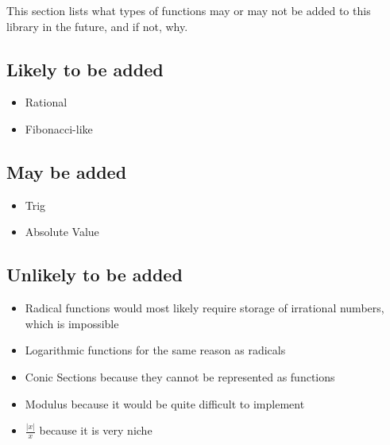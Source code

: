 \documentclass[12pt, letterpaper]{article}
\begin{document}
This section lists what types of functions may or may not be added
to this library in the future, and if not, why.

\subsection{Likely to be added}
\begin{itemize}
    \item Rational
    \item Fibonacci-like
\end{itemize}


\subsection{May be added}
\begin{itemize}
    \item Trig
    \item Absolute Value
\end{itemize}

\subsection{Unlikely to be added}
\begin{itemize}
    \item Radical functions would most likely require storage of 
        irrational numbers, which is impossible
    \item Logarithmic functions for the same reason as radicals
    \item Conic Sections because they cannot be represented as functions
    \item Modulus because it would be quite difficult to implement
    \item \(\frac{|x|}{x}\) because it is very niche
\end{itemize}
\end{document}

